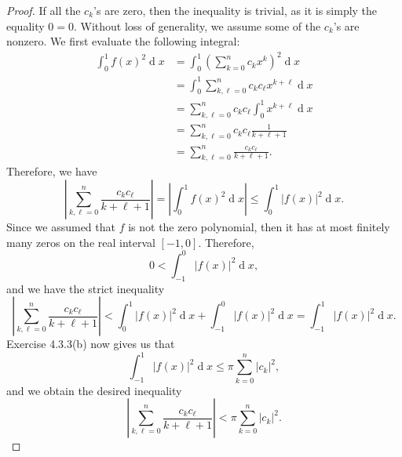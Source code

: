\documentclass[12pt]{article}
\newcommand{\<}{\left\langle} %
\renewcommand{\>}{\right\rangle} %
\renewcommand{\d}[1]{\operatorname{d}\!#1} %
\begin{document}
\begin{proof}
    If all the $c_k$'s are zero, then the inequality is trivial, as it is simply the equality $0 = 0$. Without loss of generality, we assume some of the $c_k$'s are nonzero. We first evaluate the following integral:
    \begin{align*}
        \int_0^1f(x)^2 \d{x}
            &= \int_0^1 \left( \sum_{k=0}^n c_k x^k \right)^2 \d{x} \\
            &= \int_0^1 \sum_{k,\ell = 0}^n c_k c_\ell x^{k + \ell}  \d{x} \\
            &= \sum_{k,\ell = 0}^n c_k c_\ell \int_0^1 x^{k + \ell}  \d{x} \\
            &= \sum_{k,\ell = 0}^n c_k c_\ell \frac{1}{k + \ell + 1} \\
            &= \sum_{k,\ell = 0}^n \frac{c_k c_\ell }{k + \ell + 1}.
    \end{align*}
    Therefore, we have
    \[\left| \sum_{k,\ell = 0}^n \frac{c_k c_\ell }{k + \ell + 1} \right| = \left| \int_0^1f(x)^2 \d{x} \right| \leq \int_0^1 |f(x)|^2 \d{x}.\]
    Since we assumed that $f$ is not the zero polynomial, then it has at most finitely many zeros on the real interval $[-1, 0]$. Therefore,
    \[0 < \int_{-1}^0 |f(x)|^2 \d{x},\]
    and we have the strict inequality
    \[\left| \sum_{k,\ell = 0}^n \frac{c_k c_\ell }{k + \ell + 1} \right| < \int_0^1 |f(x)|^2 \d{x} + \int_{-1}^0 |f(x)|^2 \d{x} = \int_{-1}^1 |f(x)|^2 \d{x}.\]
    Exercise 4.3.3(b) now gives us that
    \[\int_{-1}^1 |f(x)|^2 \d{x} \leq \pi \sum_{k=0}^n |c_k|^2,\]
    and we obtain the desired inequality
    \[\left| \sum_{k,\ell = 0}^n \frac{c_k c_\ell }{k + \ell + 1} \right| < \pi \sum_{k=0}^n |c_k|^2.\]
    
\end{proof}
\end{document}
